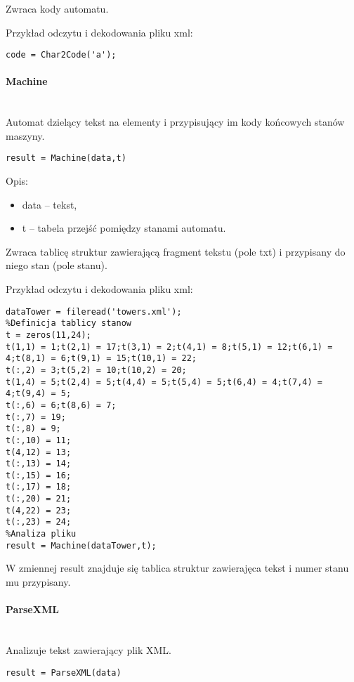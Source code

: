 Zwraca kody automatu.

Przykład odczytu i dekodowania pliku xml:
\begin{lstlisting}[style=Matlab-editor]
%Konwersja znaku
code = Char2Code('a');
\end{lstlisting}

\paragraph{Machine} \hspace{0pt} \\
Automat dzielący tekst na elementy i przypisujący im kody końcowych stanów maszyny.
\begin{lstlisting}[style=Matlab-editor]
result = Machine(data,t)
\end{lstlisting}

Opis:
\begin{itemize}
\item data -- tekst,
\item t -- tabela przejść pomiędzy stanami automatu.
\end{itemize}

Zwraca tablicę struktur zawierającą fragment tekstu (pole txt) i przypisany do niego stan (pole stanu).

Przykład odczytu i dekodowania pliku xml:
\begin{lstlisting}[style=Matlab-editor]
%Odczyt pliku xml
dataTower = fileread('towers.xml');
%Definicja tablicy stanow
t = zeros(11,24);
t(1,1) = 1;t(2,1) = 17;t(3,1) = 2;t(4,1) = 8;t(5,1) = 12;t(6,1) = 4;t(8,1) = 6;t(9,1) = 15;t(10,1) = 22;
t(:,2) = 3;t(5,2) = 10;t(10,2) = 20;
t(1,4) = 5;t(2,4) = 5;t(4,4) = 5;t(5,4) = 5;t(6,4) = 4;t(7,4) = 4;t(9,4) = 5;
t(:,6) = 6;t(8,6) = 7;
t(:,7) = 19;
t(:,8) = 9;
t(:,10) = 11;
t(4,12) = 13;
t(:,13) = 14;
t(:,15) = 16;
t(:,17) = 18;
t(:,20) = 21;
t(4,22) = 23;
t(:,23) = 24;
%Analiza pliku
result = Machine(dataTower,t);
\end{lstlisting}

W zmiennej result znajduje się tablica struktur zawierajęca tekst i numer stanu mu przypisany. 

\paragraph{ParseXML} \hspace{0pt} \\
Analizuje tekst zawierający plik XML.
\begin{lstlisting}[style=Matlab-editor]
result = ParseXML(data)
\end{lstlisting}

